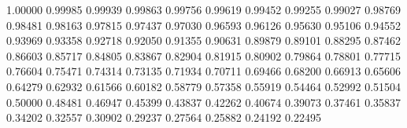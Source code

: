 \def\pgfmath@def#1#2#3{\expandafter\def\csname pgfmath@#1@#2\endcsname{#3}}
\pgfmath@def{cos}{0}{1.00000}    \pgfmath@def{cos}{1}{0.99985}
\pgfmath@def{cos}{2}{0.99939}    \pgfmath@def{cos}{3}{0.99863}
\pgfmath@def{cos}{4}{0.99756}    \pgfmath@def{cos}{5}{0.99619}
\pgfmath@def{cos}{6}{0.99452}    \pgfmath@def{cos}{7}{0.99255}
\pgfmath@def{cos}{8}{0.99027}    \pgfmath@def{cos}{9}{0.98769}
\pgfmath@def{cos}{10}{0.98481}    \pgfmath@def{cos}{11}{0.98163}
\pgfmath@def{cos}{12}{0.97815}    \pgfmath@def{cos}{13}{0.97437}
\pgfmath@def{cos}{14}{0.97030}    \pgfmath@def{cos}{15}{0.96593}
\pgfmath@def{cos}{16}{0.96126}    \pgfmath@def{cos}{17}{0.95630}
\pgfmath@def{cos}{18}{0.95106}    \pgfmath@def{cos}{19}{0.94552}
\pgfmath@def{cos}{20}{0.93969}    \pgfmath@def{cos}{21}{0.93358}
\pgfmath@def{cos}{22}{0.92718}    \pgfmath@def{cos}{23}{0.92050}
\pgfmath@def{cos}{24}{0.91355}    \pgfmath@def{cos}{25}{0.90631}
\pgfmath@def{cos}{26}{0.89879}    \pgfmath@def{cos}{27}{0.89101}
\pgfmath@def{cos}{28}{0.88295}    \pgfmath@def{cos}{29}{0.87462}
\pgfmath@def{cos}{30}{0.86603}    \pgfmath@def{cos}{31}{0.85717}
\pgfmath@def{cos}{32}{0.84805}    \pgfmath@def{cos}{33}{0.83867}
\pgfmath@def{cos}{34}{0.82904}    \pgfmath@def{cos}{35}{0.81915}
\pgfmath@def{cos}{36}{0.80902}    \pgfmath@def{cos}{37}{0.79864}
\pgfmath@def{cos}{38}{0.78801}    \pgfmath@def{cos}{39}{0.77715}
\pgfmath@def{cos}{40}{0.76604}    \pgfmath@def{cos}{41}{0.75471}
\pgfmath@def{cos}{42}{0.74314}    \pgfmath@def{cos}{43}{0.73135}
\pgfmath@def{cos}{44}{0.71934}    \pgfmath@def{cos}{45}{0.70711}
\pgfmath@def{cos}{46}{0.69466}    \pgfmath@def{cos}{47}{0.68200}
\pgfmath@def{cos}{48}{0.66913}    \pgfmath@def{cos}{49}{0.65606}
\pgfmath@def{cos}{50}{0.64279}    \pgfmath@def{cos}{51}{0.62932}
\pgfmath@def{cos}{52}{0.61566}    \pgfmath@def{cos}{53}{0.60182}
\pgfmath@def{cos}{54}{0.58779}    \pgfmath@def{cos}{55}{0.57358}
\pgfmath@def{cos}{56}{0.55919}    \pgfmath@def{cos}{57}{0.54464}
\pgfmath@def{cos}{58}{0.52992}    \pgfmath@def{cos}{59}{0.51504}
\pgfmath@def{cos}{60}{0.50000}    \pgfmath@def{cos}{61}{0.48481}
\pgfmath@def{cos}{62}{0.46947}    \pgfmath@def{cos}{63}{0.45399}
\pgfmath@def{cos}{64}{0.43837}    \pgfmath@def{cos}{65}{0.42262}
\pgfmath@def{cos}{66}{0.40674}    \pgfmath@def{cos}{67}{0.39073}
\pgfmath@def{cos}{68}{0.37461}    \pgfmath@def{cos}{69}{0.35837}
\pgfmath@def{cos}{70}{0.34202}    \pgfmath@def{cos}{71}{0.32557}
\pgfmath@def{cos}{72}{0.30902}    \pgfmath@def{cos}{73}{0.29237}
\pgfmath@def{cos}{74}{0.27564}    \pgfmath@def{cos}{75}{0.25882}
\pgfmath@def{cos}{76}{0.24192}    \pgfmath@def{cos}{77}{0.22495}
